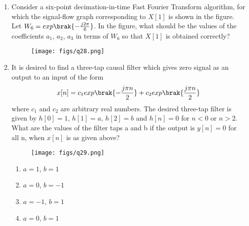 \documentclass[a4paper, 11pt]{article}
\begin{document}
\begin{enumerate}
    \item Consider a six-point decimation-in-time Fast Fourier Transform  algorithm, for which the signal-flow graph corresponding to $X[1]$ is shown in the figure. Let $W_{6}=exp\brak{-\frac{j2\pi}{6}}$. In the figure, what should be the values of the coefficients $a_{1}$, $a_{2}$, $a_{3}$ in terms of $W_{6}$ so that $X[1]$ is obtained correctly?
    
    \begin{figure}[H]
        \centering
        \texttt{[image: figs/q28.png]}
        \caption*{}
        \label{fig:q28}
    \end{figure}
    
    \begin{enumerate}
    \end{enumerate}
    
    \hfill{}

    \item It is desired to find a three-tap causal filter which gives zero signal as an output to an input of the form
    \[
    x[n]=c_{1}exp\brak{-\frac{j\pi n}{2}}+c_{2}exp\brak{\frac{j\pi n}{2}}
    \]
    where $c_{1}$ and $c_{2}$ are arbitrary real numbers. The desired three-tap filter is given by
    $h[0]=1$, $h[1]=a$, $h[2]=b$ and $h[n]=0$ for $n<0$ or $n>2$. What are the values of the filter taps a and b if the output is $y[n]=0$ for all n, when $x[n]$ is as given above?
    
    \begin{figure}[H]
        \centering
        \texttt{[image: figs/q29.png]}
        \caption*{}
        \label{fig:q29}
    \end{figure}

    \begin{enumerate}
        \item $a=1$, $b=1$
        \item $a=0$, $b=-1$
        \item $a=-1$, $b=1$
        \item $a=0$, $b=1$
    \end{enumerate}
    

\end{enumerate}
\end{document}
